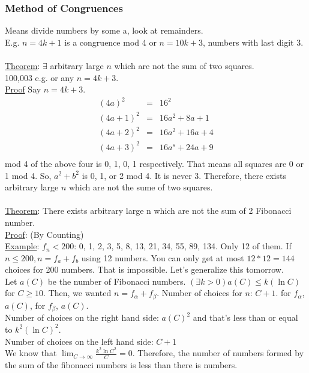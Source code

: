 \documentclass[13pt]{article}
\begin{document}
	\subsubsection*{Method of Congruences}
		Means divide numbers by some a, look at remainders.\\
		E.g. $n = 4k + 1$ is a congruence mod 4 or $n = 10k + 3$, numbers with 
		last digit 3.\\\\
		\underline{Theorem}: $\exists$ arbitrary large $n$ which are not the
		sum of two squares. \\
		100,003 e.g. or any $n = 4k + 3$.\\
		\underline{Proof} Say $n = 4k + 3$.
			\begin{eqnarray*}
				(4a)^2 & = & 16^2\\
				(4a + 1)^2 & = & 16a^2 + 8a + 1\\
				(4a + 2)^2 & = & 16a^2 + 16a + 4 \\
				(4a + 3)^2 & = & 16a^s + 24a + 9 \\
			\end{eqnarray*}
			mod 4 of the above four is 0, 1, 0, 1 respectively. That means all
			squares are 0 or 1 mod 4. So, $a^2 +b^2$ is 0, 1, or 2 mod 4. It
			is never 3. Therefore, there exists arbitrary large $n$ which are
			not the sume of two squares.\\\\
		\underline{Theorem}: There exists arbitrary large n which are not
		the sum of 2 Fibonacci number. \\
		\underline{Proof}: (By Counting)\\
		\underline{Example}: $f_n < 200$: 0, 1, 2, 3, 5, 8, 13, 21, 34, 55, 89,
		134. Only 12 of them. If $n \le 200, n = f_a + f_b$ using 12 numbers.
		You can only get at most $12 * 12 = 144$ choices for 200 numbers.
		That is impossible. Let's generalize this tomorrow.\\

		Let $a(C)$ be the number of Fibonacci numbers. 
		$(\exists k > 0)a(C) \le k(\ln{C})$ for $C \ge 10$.
		Then, we wanted $n = f_{\alpha} + f_{\beta}$.
		Number of choices for $n$: $C+1$. for $f_{\alpha}$, $a(C)$, for
		$f_{\beta}$, $a(C)$.\\
		Number of choices on the right hand side: $a(C)^2$ and that's less
		than or equal to  $k^2(\ln{C})^2$. \\
		Number of choices on the left hand side: $C+1$\\
		We know that $\lim_{C \to \infty}{\frac{k^2\ln{C}^2}{C}} = 0$.
		Therefore, the number of numbers formed by the sum of the fibonacci
		numbers is less than there is numbers. \\
\end{document}

